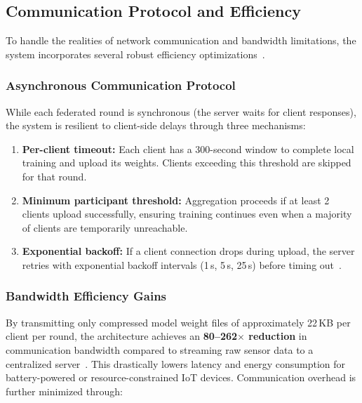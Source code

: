 \documentclass[pdflatex,sn-mathphys-num]{sn-jnl}
\theoremstyle{thmstyleone}
\theoremstyle{thmstyletwo}
\theoremstyle{thmstylethree}
\begin{document}
\subsection{Communication Protocol and Efficiency}

To handle the realities of network communication and bandwidth limitations, the
system incorporates several robust efficiency optimizations~\cite{tariq2024trustworthy}.

\subsubsection{Asynchronous Communication Protocol}

While each federated round is synchronous (the server waits for client
responses), the system is resilient to client-side delays through three
mechanisms:

\begin{enumerate}
    \item \textbf{Per-client timeout:} Each client has a 300-second window to
    complete local training and upload its weights. Clients exceeding this
    threshold are skipped for that round.
    \item \textbf{Minimum participant threshold:} Aggregation proceeds if at
    least 2 clients upload successfully, ensuring training continues even when
    a majority of clients are temporarily unreachable.
    \item \textbf{Exponential backoff:} If a client connection drops during
    upload, the server retries with exponential backoff intervals
    (1\,s, 5\,s, 25\,s) before timing out~\cite{qin2025fedcontrastive}.
\end{enumerate}

\subsubsection{Bandwidth Efficiency Gains}

By transmitting only compressed model weight files of approximately 22\,KB per
client per round, the architecture achieves an \textbf{80--262$\times$ reduction}
in communication bandwidth compared to streaming raw sensor data to a centralized
server~\cite{mcmahan2017fedavg,liu2020fedgru}. This drastically lowers latency
and energy consumption for battery-powered or resource-constrained IoT devices.
Communication overhead is further minimized through:
\end{document}
